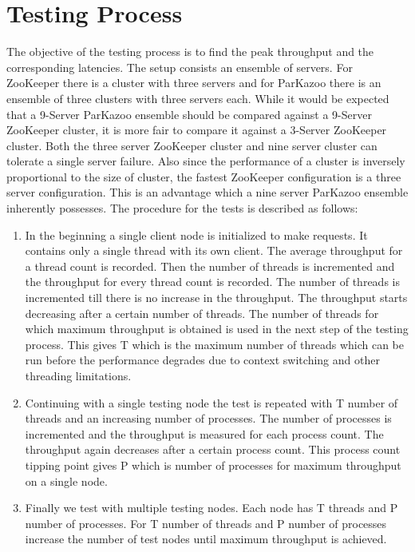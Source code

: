 







\section{Testing Process}
The objective of the testing process is to find the peak throughput and the corresponding latencies. The setup consists an ensemble of servers. For ZooKeeper there is a cluster with three servers and for ParKazoo there is an ensemble of three clusters with three servers each. While it would be expected that a 9-Server ParKazoo ensemble should be compared against a 9-Server ZooKeeper cluster, it is more fair to compare it against a 3-Server ZooKeeper cluster. Both the three server ZooKeeper cluster and nine server cluster can tolerate a single server failure. Also since the performance of a cluster is inversely proportional to the size of cluster, the fastest ZooKeeper configuration is a three server configuration. This is an advantage which a nine server ParKazoo ensemble inherently possesses. The procedure for the tests is described as follows:

\begin{enumerate}
	\item In the beginning a single client node is initialized to make requests. It contains only a single thread with its own client. The average throughput for a thread count is recorded. Then the number of threads is incremented and the throughput for every thread count is recorded. The number of threads is incremented till there is no increase in the throughput. The throughput starts decreasing after a certain number of threads. The number of threads for which maximum throughput is obtained is used in the next step of the testing process. This gives T which is the maximum number of threads which can be run before the performance degrades due to context switching and other threading limitations.
	\item Continuing with a single testing node the test is repeated with T number of threads and an increasing number of processes. The number of processes is incremented and the throughput is measured for each process count. The throughput again decreases after a certain process count. This process count tipping point gives P which is number of processes for maximum throughput on a single node.
	\item Finally we test with multiple testing nodes. Each node has T threads and P number of processes. For T number of threads and P number of processes increase the number of test nodes until maximum throughput is achieved.
\end{enumerate}

